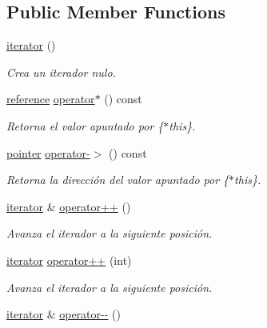 \subsection*{Public Member Functions}
\begin{DoxyCompactItemize}
\item 
\hyperlink{classaed2_1_1iterator_1_1iterator_ae488782067dfba96b447080b0db1ed2c}{iterator} ()
\begin{DoxyCompactList}\small\item\em Crea un iterador nulo. \end{DoxyCompactList}\item 
\hyperlink{classaed2_1_1iterator_1_1iterator_a91be74b60dfc3eabfa5a69d9aa068959}{reference} \hyperlink{classaed2_1_1iterator_1_1iterator_a5d87de9e96d5efd0456e8f7aec240b8d}{operator$\ast$} () const
\begin{DoxyCompactList}\small\item\em Retorna el valor apuntado por \{$\ast$this\}. \end{DoxyCompactList}\item 
\hyperlink{classaed2_1_1iterator_1_1iterator_add8c8243f6b0e3cb7b67ce06757df53b}{pointer} \hyperlink{classaed2_1_1iterator_1_1iterator_a9e9f5ca8d13a6945d6520736c0cc1a4f}{operator-\/$>$} () const
\begin{DoxyCompactList}\small\item\em Retorna la dirección del valor apuntado por \{$\ast$this\}. \end{DoxyCompactList}\item 
\hyperlink{classaed2_1_1iterator_1_1iterator}{iterator} \& \hyperlink{classaed2_1_1iterator_1_1iterator_a457fdf0ed06c88121b441424f1c99f4f}{operator++} ()
\begin{DoxyCompactList}\small\item\em Avanza el iterador a la siguiente posición. \end{DoxyCompactList}\item 
\hyperlink{classaed2_1_1iterator_1_1iterator}{iterator} \hyperlink{classaed2_1_1iterator_1_1iterator_aa2023454f3ce45f7da4ef23d7a7f6749}{operator++} (int)
\begin{DoxyCompactList}\small\item\em Avanza el iterador a la siguiente posición. \end{DoxyCompactList}\item 
\hyperlink{classaed2_1_1iterator_1_1iterator}{iterator} \& \hyperlink{classaed2_1_1iterator_1_1iterator_a260692ee1d51f87ef547b4a798fc2de5}{operator-\/-\/} ()

\end{DoxyCompactItemize}
